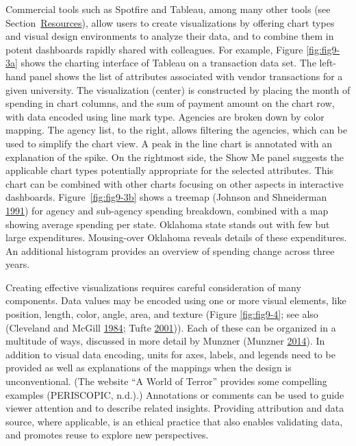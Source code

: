 \documentclass[]{krantz}
\begin{document}
Commercial tools such as Spotfire and Tableau, among many other tools
(see Section~\protect\hyperlink{sec:mylabel4}{Resources}), allow users
to create visualizations by offering chart types and visual design
environments to analyze their data, and to combine them in potent
dashboards rapidly shared with colleagues. For example, Figure
\ref{fig:fig9-3a} shows the charting interface of Tableau on a
transaction data set. The left-hand panel shows the list of attributes
associated with vendor transactions for a given university. The
visualization (center) is constructed by placing the month of spending
in chart columns, and the sum of payment amount on the chart row, with
data encoded using line mark type. Agencies are broken down by color
mapping. The agency list, to the right, allows filtering the agencies,
which can be used to simplify the chart view. A peak in the line chart
is annotated with an explanation of the spike. On the rightmost side,
the Show Me panel suggests the applicable chart types potentially
appropriate for the selected attributes. This chart can be combined with
other charts focusing on other aspects in interactive dashboards.
Figure~\ref{fig:fig9-3b} shows a treemap (Johnson and Shneiderman
\protect\hyperlink{ref-johnson1991tree}{1991}) for agency and sub-agency
spending breakdown, combined with a map showing average spending per
state. Oklahoma state stands out with few but large expenditures.
Mousing-over Oklahoma reveals details of these expenditures. An
additional histogram provides an overview of spending change across
three years.

Creating effective visualizations requires careful consideration of many
components. Data values may be encoded using one or more visual
elements, like position, length, color, angle, area, and texture (Figure
\ref{fig:fig9-4}; see also (Cleveland and McGill
\protect\hyperlink{ref-cleveland1984graphical}{1984}; Tufte
\protect\hyperlink{ref-edward2001visual}{2001})). Each of these can be
organized in a multitude of ways, discussed in more detail by Munzner
(Munzner \protect\hyperlink{ref-munzner2014visualization}{2014}). In
addition to visual data encoding, units for axes, labels, and legends
need to be provided as well as explanations of the mappings when the
design is unconventional. (The website ``A World of Terror'' provides
some compelling examples (PERISCOPIC, n.d.).) Annotations or comments
can be used to guide viewer attention and to describe related insights.
Providing attribution and data source, where applicable, is an ethical
practice that also enables validating data, and promotes reuse to
explore new perspectives.
\end{document}

